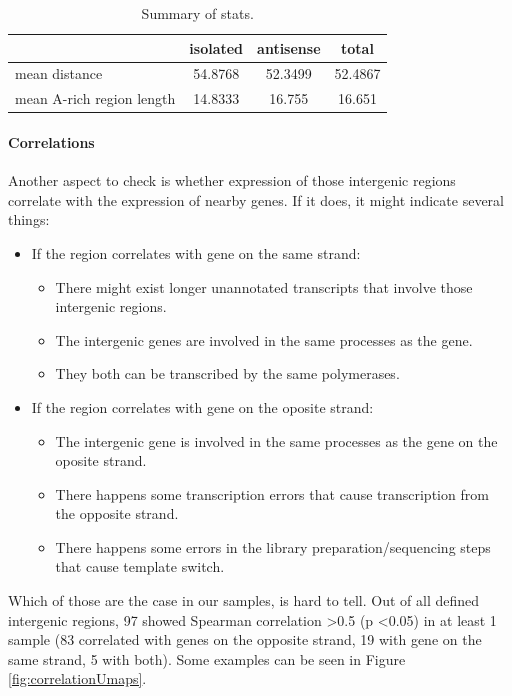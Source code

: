 \begin{table}[htbp]
  \centering
  \begin{tabular}{l|ccc}
    \toprule
     & isolated & antisense & total  \\
    \midrule
    mean distance & 54.8768 & 52.3499 & 52.4867 \\
    mean A-rich region length & 14.8333 & 16.755 & 16.651 \\
    \bottomrule
  \end{tabular}
  \caption{Summary of stats.}
  \label{tab:polyAstats}
\end{table}


\paragraph{Correlations}

Another aspect to check is whether expression of those intergenic regions correlate with the expression of nearby genes.
If it does, it might indicate several things:
\begin{itemize}
  \item If the region correlates with gene on the same strand:
  \begin{itemize}
    \item There might exist longer unannotated transcripts that involve those intergenic regions.
    \item The intergenic genes are involved in the same processes as the gene.
    \item They both can be transcribed by the same polymerases.
  \end{itemize}
  \item If the region correlates with gene on the oposite strand:
  \begin{itemize}
    \item The intergenic gene is involved in the same processes as the gene on the oposite strand.
    \item There happens some transcription errors that cause transcription from the opposite strand.
    \item There happens some errors in the library preparation/sequencing steps that cause template switch.
  \end{itemize}
\end{itemize}

Which of those are the case in our samples, is hard to tell.
Out of all defined intergenic regions, 97 showed Spearman correlation \textgreater 0.5 (p \textless 0.05) in at least 1 sample
(83 correlated with genes on the opposite strand, 19 with gene on the same strand, 5 with both).
Some examples can be seen in Figure \ref{fig:correlationUmaps}.

